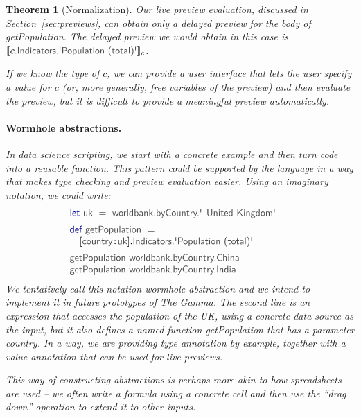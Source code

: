 \documentclass[acmsmall,anonymous,fleqn]{acmart}\settopmatter{printfolios=false,printccs=false,printacmref=false}
\newcounter{thc}
\theoremstyle{plain}
\newtheorem{theorem}[thc]{Theorem}
\theoremstyle{definition}
\newcommand{\ident}[1]{\textnormal{\textcolor{idclr}{\sffamily #1}}}
\newcommand{\kvd}[1]{\textnormal{\textcolor{kvdclr}{\sffamily #1}}}
\begin{document}
\begin{theorem}[Normalization]
Our live preview evaluation, discussed in Section~\ref{sec:previews}, can obtain only a delayed
preview for the body of \ident{getPopulation}. The delayed preview we would obtain in this case
is $\llbracket c.\ident{Indicators}.\ident{\textquotesingle Population (total)\textquotesingle} \rrbracket_{c}$.

If we know the type of $c$, we can provide a user interface that lets the user specify a value
for $c$ (or, more generally, free variables of the preview) and then evaluate the preview, but
it is difficult to provide a meaningful preview automatically.

\paragraph{Wormhole abstractions.}
In data science scripting, we start with a concrete example and then turn code into a reusable
function. This pattern could be supported by the language in a way that makes type checking
and preview evaluation easier. Using an imaginary notation, we could write:
%
\begin{equation*}
\begin{array}{l}
\kvd{let}~\ident{uk}~=~\ident{worldbank.byCountry.\textquotesingle United Kingdom\textquotesingle}\hspace{1.5em}\\[0.5em]
\kvd{def}~\ident{getPopulation}~=\\
\quad\lbrack\ident{country}\!:\!\ident{uk}\rbrack.\ident{Indicators.\textquotesingle Population (total)\textquotesingle}\\[0.5em]
\ident{getPopulation}~\ident{worldbank.byCountry.China}\\
\ident{getPopulation}~\ident{worldbank.byCountry.India}
\end{array}
\end{equation*}
%
We tentatively call this notation \emph{wormhole} abstraction and we intend to implement it in future prototypes of The Gamma.
The second line is an expression that accesses the population of the UK, using a concrete
data source as the input, but it also defines a named function \ident{getPopulation} that has a
parameter \ident{country}. In a way, we are providing \emph{type annotation} by example, together
with a \emph{value annotation} that can be used for live previews.

This way of constructing abstractions is perhaps more akin to how spreadsheets are used -- we often
write a formula using a concrete cell and then use the ``drag down'' operation to extend it to
other inputs.


\end{theorem}
\end{document}
